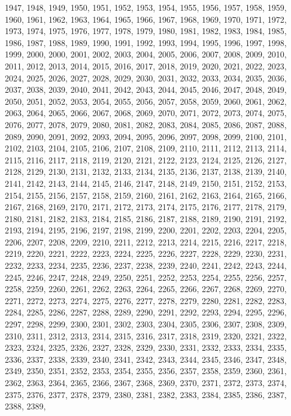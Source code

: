 \documentclass[a4paper,11pt]{article}
\numberwithin{equation}{section}
\begin{document}
1947, 1948, 1949, 1950, 1951, 1952, 1953, 1954, 1955, 1956, 1957, 1958,
1959, 1960, 1961, 1962, 1963, 1964, 1965, 1966, 1967, 1968, 1969, 1970,
1971, 1972, 1973, 1974, 1975, 1976, 1977, 1978, 1979, 1980, 1981, 1982,
1983, 1984, 1985, 1986, 1987, 1988, 1989, 1990, 1991, 1992, 1993, 1994,
1995, 1996, 1997, 1998, 1999, 2000, 2000, 2001, 2002, 2003, 2004, 2005,
2006, 2007, 2008, 2009, 2010, 2011, 2012, 2013, 2014, 2015, 2016, 2017,
2018, 2019, 2020, 2021, 2022, 2023, 2024, 2025, 2026, 2027, 2028, 2029,
2030, 2031, 2032, 2033, 2034, 2035, 2036, 2037, 2038, 2039, 2040, 2041,
2042, 2043, 2044, 2045, 2046, 2047, 2048, 2049, 2050, 2051, 2052, 2053,
2054, 2055, 2056, 2057, 2058, 2059, 2060, 2061, 2062, 2063, 2064, 2065,
2066, 2067, 2068, 2069, 2070, 2071, 2072, 2073, 2074, 2075, 2076, 2077,
2078, 2079, 2080, 2081, 2082, 2083, 2084, 2085, 2086, 2087, 2088, 2089,
2090, 2091, 2092, 2093, 2094, 2095, 2096, 2097, 2098, 2099, 2100, 2101,
2102, 2103, 2104, 2105, 2106, 2107, 2108, 2109, 2110, 2111, 2112, 2113,
2114, 2115, 2116, 2117, 2118, 2119, 2120, 2121, 2122, 2123, 2124, 2125,
2126, 2127, 2128, 2129, 2130, 2131, 2132, 2133, 2134, 2135, 2136, 2137,
2138, 2139, 2140, 2141, 2142, 2143, 2144, 2145, 2146, 2147, 2148, 2149,
2150, 2151, 2152, 2153, 2154, 2155, 2156, 2157, 2158, 2159, 2160, 2161,
2162, 2163, 2164, 2165, 2166, 2167, 2168, 2169, 2170, 2171, 2172, 2173,
2174, 2175, 2176, 2177, 2178, 2179, 2180, 2181, 2182, 2183, 2184, 2185,
2186, 2187, 2188, 2189, 2190, 2191, 2192, 2193, 2194, 2195, 2196, 2197,
2198, 2199, 2200, 2201, 2202, 2203, 2204, 2205, 2206, 2207, 2208, 2209,
2210, 2211, 2212, 2213, 2214, 2215, 2216, 2217, 2218, 2219, 2220, 2221,
2222, 2223, 2224, 2225, 2226, 2227, 2228, 2229, 2230, 2231, 2232, 2233,
2234, 2235, 2236, 2237, 2238, 2239, 2240, 2241, 2242, 2243, 2244, 2245,
2246, 2247, 2248, 2249, 2250, 2251, 2252, 2253, 2254, 2255, 2256, 2257,
2258, 2259, 2260, 2261, 2262, 2263, 2264, 2265, 2266, 2267, 2268, 2269,
2270, 2271, 2272, 2273, 2274, 2275, 2276, 2277, 2278, 2279, 2280, 2281,
2282, 2283, 2284, 2285, 2286, 2287, 2288, 2289, 2290, 2291, 2292, 2293,
2294, 2295, 2296, 2297, 2298, 2299, 2300, 2301, 2302, 2303, 2304, 2305,
2306, 2307, 2308, 2309, 2310, 2311, 2312, 2313, 2314, 2315, 2316, 2317,
2318, 2319, 2320, 2321, 2322, 2323, 2324, 2325, 2326, 2327, 2328, 2329,
2330, 2331, 2332, 2333, 2334, 2335, 2336, 2337, 2338, 2339, 2340, 2341,
2342, 2343, 2344, 2345, 2346, 2347, 2348, 2349, 2350, 2351, 2352, 2353,
2354, 2355, 2356, 2357, 2358, 2359, 2360, 2361, 2362, 2363, 2364, 2365,
2366, 2367, 2368, 2369, 2370, 2371, 2372, 2373, 2374, 2375, 2376, 2377,
2378, 2379, 2380, 2381, 2382, 2383, 2384, 2385, 2386, 2387, 2388, 2389,
\end{document}

